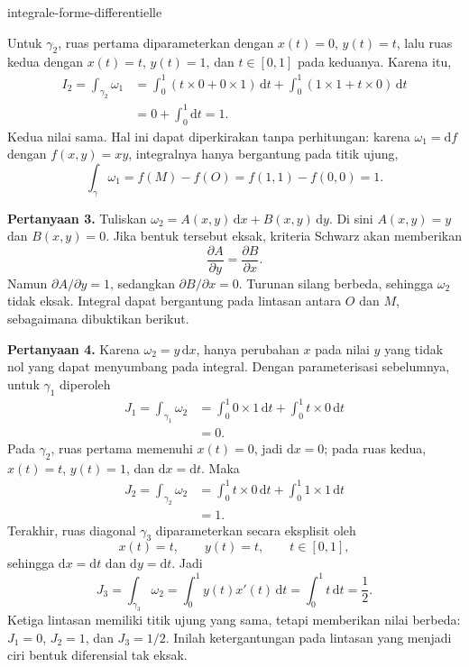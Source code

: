 \begin{exo}{integrale-forme-differentielle}
\begin{solution}
Untuk $\gamma_2$, ruas pertama diparameterkan dengan $x(t)=0$, $y(t)=t$,
lalu ruas kedua dengan $x(t)=t$, $y(t)=1$, dan $t\in[0,1]$ pada keduanya.
Karena itu,
\[
\begin{aligned}
I_2
= \int_{\gamma_2}\omega_1
&= \int_0^1\left(t\times 0+0\times 1\right)\,\mathrm{d}t
 + \int_0^1\left(1\times 1+t\times 0\right)\,\mathrm{d}t \\
&= 0+\int_0^1\mathrm{d}t = 1.
\end{aligned}
\]
Kedua nilai sama. Hal ini dapat diperkirakan tanpa perhitungan: karena
$\omega_1=\mathrm{d}f$ dengan $f(x,y)=xy$, integralnya hanya bergantung pada
titik ujung,
\[
\int_\gamma\omega_1=f(M)-f(O)=f(1,1)-f(0,0)=1.
\]

\textbf{Pertanyaan 3.} Tuliskan $\omega_2=A(x,y)\,\mathrm{d}x+B(x,y)\,\mathrm{d}y$.
Di sini $A(x,y)=y$ dan $B(x,y)=0$. Jika bentuk tersebut eksak, kriteria Schwarz
akan memberikan
\[
\frac{\partial A}{\partial y}=\frac{\partial B}{\partial x}.
\]
Namun $\partial A/\partial y=1$, sedangkan $\partial B/\partial x=0$.
Turunan silang berbeda, sehingga $\omega_2$ tidak eksak. Integral dapat
bergantung pada lintasan antara $O$ dan $M$, sebagaimana dibuktikan berikut.

\textbf{Pertanyaan 4.} Karena $\omega_2=y\,\mathrm{d}x$, hanya perubahan $x$
pada nilai $y$ yang tidak nol yang dapat menyumbang pada integral. Dengan
parameterisasi sebelumnya, untuk $\gamma_1$ diperoleh
\[
\begin{aligned}
J_1
=\int_{\gamma_1}\omega_2
&=\int_0^1 0\times 1\,\mathrm{d}t
  +\int_0^1 t\times 0\,\mathrm{d}t \\
&=0.
\end{aligned}
\]
Pada $\gamma_2$, ruas pertama memenuhi $x(t)=0$, jadi $\mathrm{d}x=0$;
pada ruas kedua, $x(t)=t$, $y(t)=1$, dan $\mathrm{d}x=\mathrm{d}t$. Maka
\[
\begin{aligned}
J_2
=\int_{\gamma_2}\omega_2
&=\int_0^1 t\times 0\,\mathrm{d}t
  +\int_0^1 1\times 1\,\mathrm{d}t \\
&=1.
\end{aligned}
\]
Terakhir, ruas diagonal $\gamma_3$ diparameterkan secara eksplisit oleh
\[
x(t)=t,\qquad y(t)=t,\qquad t\in[0,1],
\]
sehingga $\mathrm{d}x=\mathrm{d}t$ dan $\mathrm{d}y=\mathrm{d}t$. Jadi
\[
J_3
=\int_{\gamma_3}\omega_2
=\int_0^1 y(t)x'(t)\,\mathrm{d}t
=\int_0^1 t\,\mathrm{d}t
=\frac12.
\]
Ketiga lintasan memiliki titik ujung yang sama, tetapi memberikan nilai
berbeda: $J_1=0$, $J_2=1$, dan $J_3=1/2$. Inilah ketergantungan pada lintasan
yang menjadi ciri bentuk diferensial tak eksak.
\end{solution}
\end{exo}


